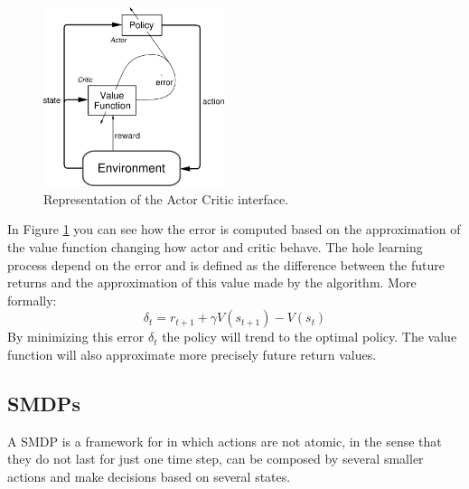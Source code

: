 \begin{figure}[hbtp]
\begin{center}
\includegraphics[width=200]{img/actor_critic.png}
\end{center}
\caption[Actor Critic diagram]
{Representation of the Actor Critic interface.}
\label{fig:AC}
\end{figure}

In Figure \ref{fig:AC} you can see how the error is computed based on the approximation of the value function
changing how actor and critic behave.
The hole learning process depend on the error and is defined as the difference between the future returns and
the approximation of this value made by the algorithm.
More formally:
\begin{equation}
    \delta_t=r_{t+1}+\gamma V(s_{t+1})-V(s_t)
\end{equation}
By minimizing this error $\delta_t$ the policy will trend to the optimal policy.
The value function will also approximate more precisely future return values.


\subsection{\aclp{SMDP}}

A \ac{SMDP} is a framework for  in which actions are not atomic, in the sense that they
do not last for just one time step, can be composed by several smaller actions and make decisions based on several states.

